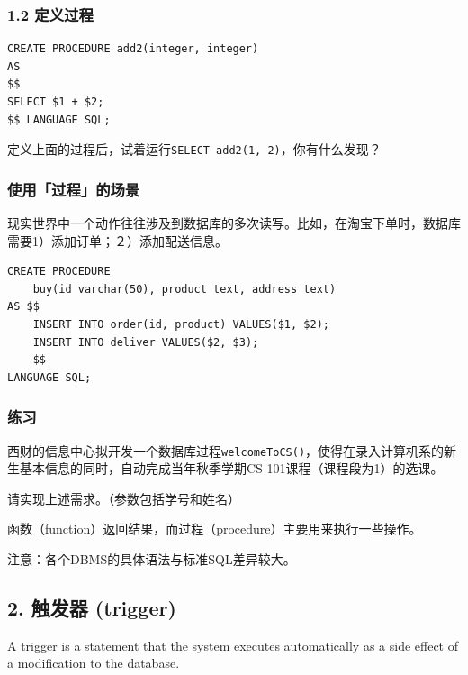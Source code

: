 \documentclass[aspectratio=169, 14pt]{beamer}
\begin{document}
\begin{frame}[fragile]
	\frametitle{1.2 定义过程}

	\begin{verbatim}
CREATE PROCEDURE add2(integer, integer)
AS
$$
SELECT $1 + $2;
$$ LANGUAGE SQL;
    \end{verbatim}

	 定义上面的过程后，试着运行\texttt{SELECT add2(1, 2)}，你有什么发现？
\end{frame}

\begin{frame}[fragile]
	\frametitle{使用「过程」的场景}
	现实世界中一个动作往往涉及到数据库的多次读写。比如，在淘宝下单时，数据库需要1）添加订单；２）添加配送信息。

	\begin{verbatim}
CREATE PROCEDURE 
    buy(id varchar(50), product text, address text)
AS $$
    INSERT INTO order(id, product) VALUES($1, $2);
    INSERT INTO deliver VALUES($2, $3);
    $$ 
LANGUAGE SQL;
\end{verbatim}

\end{frame}

\begin{frame}
	\frametitle{练习}
	西财的信息中心拟开发一个数据库过程\texttt{welcomeToCS()}，使得在录入计算机系的新生基本信息的同时，自动完成当年秋季学期CS-101课程（课程段为1）的选课。

	请实现上述需求。（参数包括学号和姓名）

\end{frame}

{
\begin{frame}[standout]
	函数（function）返回结果，而过程（procedure）主要用来执行一些操作。

	{\small {} 注意：各个DBMS的具体语法与标准SQL差异较大。}
\end{frame}
}

\begin{frame}[fragile]
	\section{\textcolor{darkmidnightblue}{2. 触发器 (trigger)}}
	A \alert{trigger} is a statement that the system executes automatically as a side effect of a modification to the database.
\end{frame}
\end{document}

